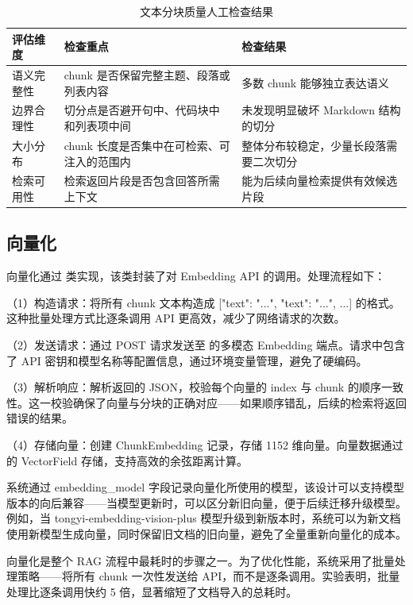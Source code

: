 \begin{table}[htb]
  \centering
  \caption{文本分块质量人工检查结果}
  \label{T.chunk_quality}
  \begin{tabular}{p{}p{}p{}}
    \hline
    评估维度 & 检查重点 & 检查结果 \\
    \hline
    语义完整性 & chunk 是否保留完整主题、段落或列表内容 & 多数 chunk 能够独立表达语义 \\
    边界合理性 & 切分点是否避开句中、代码块中和列表项中间 & 未发现明显破坏 Markdown 结构的切分 \\
    大小分布 & chunk 长度是否集中在可检索、可注入的范围内 & 整体分布较稳定，少量长段落需要二次切分 \\
    检索可用性 & 检索返回片段是否包含回答所需上下文 & 能为后续向量检索提供有效候选片段 \\
    \hline
  \end{tabular}
\end{table}


\subsection{向量化}

向量化通过  类实现，该类封装了对  Embedding API 的调用。处理流程如下：

（1）构造请求：将所有 chunk 文本构造成 [{"text": "..."}, {"text": "..."}, ...] 的格式。这种批量处理方式比逐条调用 API 更高效，减少了网络请求的次数。

（2）发送请求：通过 POST 请求发送至  的多模态 Embedding 端点。请求中包含了 API 密钥和模型名称等配置信息，通过环境变量管理，避免了硬编码。

（3）解析响应：解析返回的 JSON，校验每个向量的 index 与 chunk 的顺序一致性。这一校验确保了向量与分块的正确对应——如果顺序错乱，后续的检索将返回错误的结果。

（4）存储向量：创建 ChunkEmbedding 记录，存储 1152 维向量。向量数据通过  的 VectorField 存储，支持高效的余弦距离计算。

系统通过 embedding\_model 字段记录向量化所使用的模型，该设计可以支持模型版本的向后兼容——当模型更新时，可以区分新旧向量，便于后续迁移升级模型。例如，当 tongyi-embedding-vision-plus 模型升级到新版本时，系统可以为新文档使用新模型生成向量，同时保留旧文档的旧向量，避免了全量重新向量化的成本。

向量化是整个 RAG 流程中最耗时的步骤之一。为了优化性能，系统采用了批量处理策略——将所有 chunk 一次性发送给 API，而不是逐条调用。实验表明，批量处理比逐条调用快约 5 倍，显著缩短了文档导入的总耗时。

